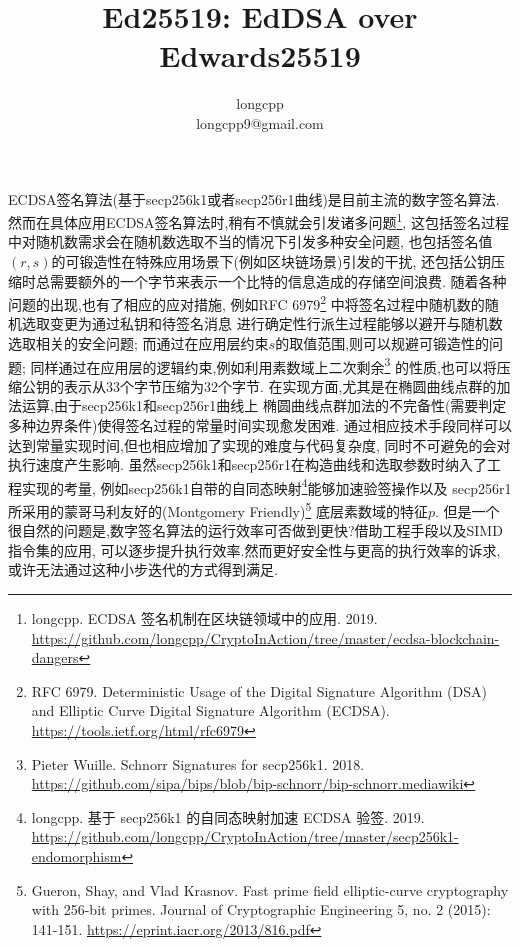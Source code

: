 \documentclass{article}
\begin{document}
\title{Ed25519: EdDSA over Edwards25519}
\author{longcpp \\ \small{longcpp9@gmail.com}}

\maketitle

ECDSA签名算法(基于secp256k1或者secp256r1曲线)是目前主流的数字签名算法.
然而在具体应用ECDSA签名算法时,稍有不慎就会引发诸多问题\footnote{
longcpp. ECDSA 签名机制在区块链领域中的应⽤. 2019.
\url{https://github.com/longcpp/CryptoInAction/tree/master/ecdsa-blockchain-dangers}},
这包括签名过程中对随机数需求会在随机数选取不当的情况下引发多种安全问题,
也包括签名值$(r,s)$的可锻造性在特殊应用场景下(例如区块链场景)引发的干扰,
还包括公钥压缩时总需要额外的一个字节来表示一个比特的信息造成的存储空间浪费.
随着各种问题的出现,也有了相应的应对措施,
例如RFC 6979\footnote{
RFC 6979. 
Deterministic Usage of the Digital Signature Algorithm (DSA) and Elliptic Curve Digital Signature Algorithm (ECDSA).
\url{https://tools.ietf.org/html/rfc6979}}
中将签名过程中随机数的随机选取变更为通过私钥和待签名消息
进行确定性行派生过程能够以避开与随机数选取相关的安全问题;
而通过在应用层约束$s$的取值范围,则可以规避可锻造性的问题;
同样通过在应用层的逻辑约束,例如利用素数域上二次剩余\footnote{
Pieter Wuille. Schnorr Signatures for secp256k1. 2018.
\url{https://github.com/sipa/bips/blob/bip-schnorr/bip-schnorr.mediawiki}}
的性质,也可以将压缩公钥的表示从33个字节压缩为32个字节.
在实现方面,尤其是在椭圆曲线点群的加法运算,由于secp256k1和secp256r1曲线上
椭圆曲线点群加法的不完备性(需要判定多种边界条件)使得签名过程的常量时间实现愈发困难.
通过相应技术手段同样可以达到常量实现时间,但也相应增加了实现的难度与代码复杂度,
同时不可避免的会对执行速度产生影响.
虽然secp256k1和secp256r1在构造曲线和选取参数时纳入了工程实现的考量,
例如secp256k1自带的自同态映射\footnote{
longcpp. 基于 secp256k1 的⾃同态映射加速 ECDSA 验签. 2019.
\url{https://github.com/longcpp/CryptoInAction/tree/master/secp256k1-endomorphism}
}能够加速验签操作以及
secp256r1所采用的蒙哥马利友好的(Montgomery Friendly)\footnote{
Gueron, Shay, and Vlad Krasnov. 
Fast prime field elliptic-curve cryptography with 256-bit primes. 
Journal of Cryptographic Engineering 5, no. 2 (2015): 141-151.
\url{https://eprint.iacr.org/2013/816.pdf}}
底层素数域的特征$p$.
但是一个很自然的问题是,数字签名算法的运行效率可否做到更快?借助工程手段以及SIMD指令集的应用,
可以逐步提升执行效率.然而更好安全性与更高的执行效率的诉求,或许无法通过这种小步迭代的方式得到满足.
\end{document}

